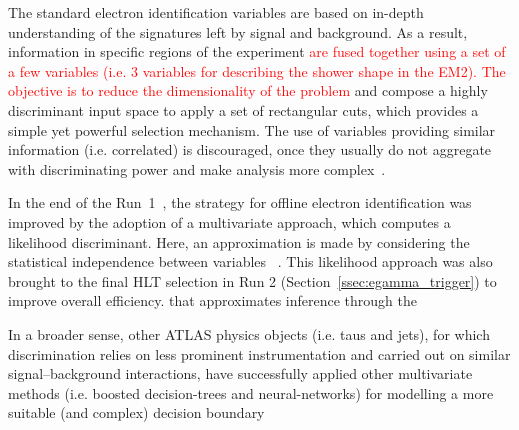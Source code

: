   
The standard electron identification variables are based on in-depth
understanding of the signatures left by signal and background.  As a result, information in specific regions of the experiment
\textcolor{red}{are fused together using a set of a few variables (i.e. 3
variables for describing the shower shape in the EM2). The objective is to reduce the dimensionality of the problem} and compose a highly discriminant input space to apply a set of rectangular cuts, which provides a simple yet powerful selection mechanism. The use of variables providing similar information
(i.e. correlated) is discouraged, once they usually do not aggregate with
discriminating power and make analysis more
complex~\cite{aaboud2019electron}.

In the end of the Run~1~\cite{PERF-2016-01}, the strategy for offline electron identification was improved by the adoption of a multivariate approach, which computes a likelihood discriminant. Here, an approximation is made by considering  the statistical independence between variables ~\cite{kendalls_vol2b}. This likelihood approach was also brought to the final HLT selection in Run 2 (Section~\ref{ssec:egamma_trigger}) to improve overall efficiency. that approximates inference through the




In a broader sense, other ATLAS physics objects (i.e. taus and jets), for
which discrimination relies on less prominent instrumentation and carried out on
similar signal--background interactions, have successfully applied other
multivariate methods (i.e. boosted decision-trees and neural-networks) for
modelling a more suitable (and complex) decision boundary

